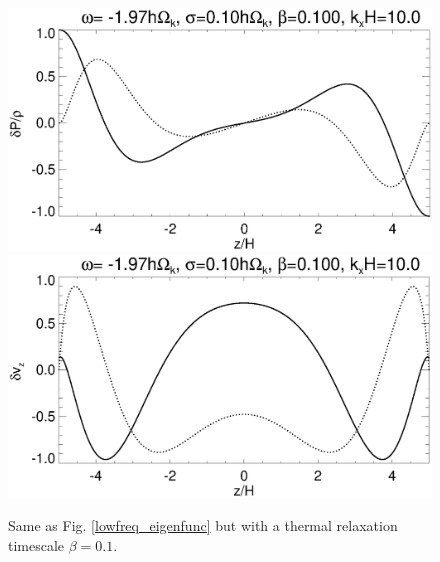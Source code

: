 %

\begin{figure}
  \includegraphics[width=\linewidth,clip=true,trim=0cm 1.75cm 0cm
  0cm]{figures/eigenvectorW_beta0d1} 
  \includegraphics[width=\linewidth,clip=true,trim=0cm 0cm 0cm
  1cm]{figures/eigenvectorvz_beta0d1}
  \caption{Same as Fig. \ref{lowfreq_eigenfunc} but with a
    thermal relaxation timescale $\beta=0.1$. 
    \label{lowfreq_eigenfunc_cool}
  }
\end{figure}

